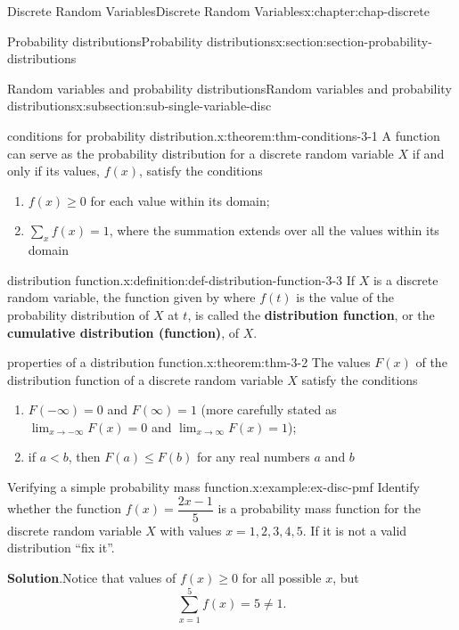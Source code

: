 \documentclass[oneside,10pt,]{book}
\newcommand{\blocktitlefont}{\relax}
\newcommand{\terminology}[1]{\textbf{#1}}
\numberwithin{equation}{section}
\newcommand{\lt}{<}
\begin{document}
\begin{chapterptx}{Discrete Random Variables}{}{Discrete Random Variables}{}{}{x:chapter:chap-discrete}
\begin{sectionptx}{Probability distributions}{}{Probability distributions}{}{}{x:section:section-probability-distributions}
\begin{subsectionptx}{Random variables and probability distributions}{}{Random variables and probability distributions}{}{}{x:subsection:sub-single-variable-disc}
\begin{theorem}{conditions for probability distribution.}{}{x:theorem:thm-conditions-3-1}
A function can serve as the probability distribution for a discrete random variable \(\displaystyle X\) if and only if its values, \(\displaystyle f(x)\), satisfy the conditions%
\begin{enumerate}
\item{}\(\displaystyle f(x) \ge 0\) for each value within its domain;%
\item{}\(\displaystyle \sum_x f(x) = 1\), where the summation extends over all the values within its domain%
\end{enumerate}
%
\end{theorem}
\begin{definition}{distribution function.}{x:definition:def-distribution-function-3-3}%
If \(\displaystyle X\) is a discrete random variable, the function given by  where \(\displaystyle f(t)\) is the value of the probability distribution of \(\displaystyle X\) at \(\displaystyle t\), is called the \terminology{distribution function}, or the \terminology{cumulative distribution (function)}, of \(\displaystyle X\).%
\end{definition}
\begin{theorem}{properties of a distribution function.}{}{x:theorem:thm-3-2}%
The values \(\displaystyle F(x)\) of the distribution function of a discrete random variable \(\displaystyle X\) satisfy the conditions%
\begin{enumerate}
\item{}\(\displaystyle F(-\infty) = 0\) and \(\displaystyle F(\infty)
= 1\) (more carefully stated as \(\displaystyle
\lim_{x\to-\infty}F(x) = 0\) and \(\displaystyle \lim_{x\to\infty}
F(x) = 1\));%
\item{}if \(\displaystyle a \lt b\), then \(\displaystyle F(a) \le
F(b)\) for any real numbers \(\displaystyle a\) and \(\displaystyle b\)%
\end{enumerate}
%
\end{theorem}
\begin{example}{Verifying a simple probability mass function.}{x:example:ex-disc-pmf}%
Identify whether the function \(f(x) = \dfrac{2x-1}{5}\) is a probability mass function for the discrete random variable \(X\) with values \(x=1,2,3,4,5\).  If it is not a valid distribution ``fix it''.%
\par\smallskip%
\noindent\textbf{\blocktitlefont Solution}.\hypertarget{g:solution:idp140361417157328}{}\quad{}Notice that values of \(f(x) \ge 0\) for all possible \(x\), but%
\begin{equation*}
\sum\limits_{x=1}^5 f(x) = 5 \neq 1.

\end{equation*}
\end{example}
\end{subsectionptx}
\end{sectionptx}
\end{chapterptx}
\end{document}
